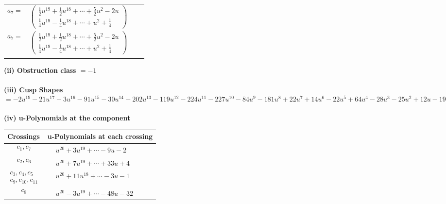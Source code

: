 \documentclass[1p]{elsarticle_modified}
\theoremstyle{definition}
\begin{document}
\begin{tabular}{m{7pt} m{180pt} m{7pt} m{180pt} }
\flushright $a_{7}=$&$\begin{pmatrix}\frac{1}{2} u^{19}+\frac{1}{2} u^{18}+\cdots+\frac{5}{2} u^2-2 u\\\frac{1}{4} u^{19}-\frac{1}{4} u^{18}+\cdots+u^2+\frac{1}{4}\end{pmatrix}$\\ \flushright $a_{7}=$&$\begin{pmatrix}\frac{1}{2} u^{19}+\frac{1}{2} u^{18}+\cdots+\frac{5}{2} u^2-2 u\\\frac{1}{4} u^{19}-\frac{1}{4} u^{18}+\cdots+u^2+\frac{1}{4}\end{pmatrix}$\\&\end{tabular}
\flushleft \textbf{(ii) Obstruction class $= -1$}\\~\\
\flushleft \textbf{(iii) Cusp Shapes $= -2 u^{19}-21 u^{17}-3 u^{16}-91 u^{15}-30 u^{14}-202 u^{13}-119 u^{12}-224 u^{11}-227 u^{10}-84 u^9-181 u^8+22 u^7+14 u^6-22 u^5+64 u^4-28 u^3-25 u^2+12 u-19$}\\~\\
\newpage\renewcommand{\arraystretch}{1}
\flushleft \textbf{(iv) u-Polynomials at the component}\newline \\
\begin{tabular}{m{50pt}|m{274pt}}
Crossings & \hspace{64pt}u-Polynomials at each crossing \\
\hline $$\begin{aligned}c_{1},c_{7}\end{aligned}$$&$\begin{aligned}
&u^{20}+3 u^{19}+\cdots-9 u-2
\end{aligned}$\\
\hline $$\begin{aligned}c_{2},c_{6}\end{aligned}$$&$\begin{aligned}
&u^{20}+7 u^{19}+\cdots+33 u+4
\end{aligned}$\\
\hline $$\begin{aligned}c_{3},c_{4},c_{5}\\c_{9},c_{10},c_{11}\end{aligned}$$&$\begin{aligned}
&u^{20}+11 u^{18}+\cdots-3 u-1
\end{aligned}$\\
\hline $$\begin{aligned}c_{8}\end{aligned}$$&$\begin{aligned}
&u^{20}-3 u^{19}+\cdots-48 u-32
\end{aligned}$\\
\hline
\end{tabular}\\~\\
\end{document}
